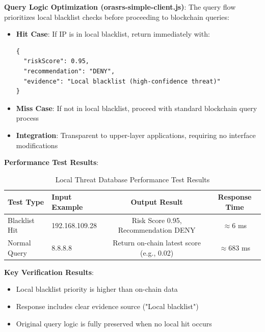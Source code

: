 \documentclass[12pt]{article}
\begin{document}
\textbf{Query Logic Optimization (orasrs-simple-client.js)}:
The query flow prioritizes local blacklist checks before proceeding to blockchain queries:
\begin{itemize}
\item \textbf{Hit Case}: If IP is in local blacklist, return immediately with:
\begin{verbatim}
{
  "riskScore": 0.95,
  "recommendation": "DENY",
  "evidence": "Local blacklist (high-confidence threat)"
}
\end{verbatim}
\item \textbf{Miss Case}: If not in local blacklist, proceed with standard blockchain query process
\item \textbf{Integration}: Transparent to upper-layer applications, requiring no interface modifications
\end{itemize}

\textbf{Performance Test Results}:
\begin{table}[H]
\centering
\begin{tabular}{@{}llcc@{}}
\toprule
\textbf{Test Type} & \textbf{Input Example} & \textbf{Output Result} & \textbf{Response Time} \\
\midrule
Blacklist Hit & 192.168.109.28 & Risk Score 0.95, Recommendation DENY & $\approx$6 ms \\
Normal Query & 8.8.8.8 & Return on-chain latest score (e.g., 0.02) & $\approx$683 ms \\
\bottomrule
\end{tabular}
\caption{Local Threat Database Performance Test Results}
\label{tab:local_db_performance}
\end{table}

\textbf{Key Verification Results}:
\begin{itemize}
\item Local blacklist priority is higher than on-chain data
\item Response includes clear evidence source ("Local blacklist")
\item Original query logic is fully preserved when no local hit occurs
\end{itemize}
\end{document}
